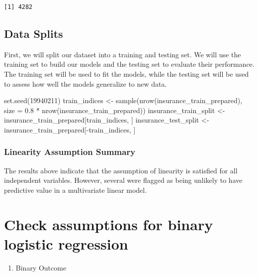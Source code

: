 \documentclass[
  11pt]{article}
\newenvironment{Shaded}{\begin{snugshade}}{\end{snugshade}}
\newcommand{\AttributeTok}[1]{\textcolor[rgb]{0.40,0.45,0.13}{#1}}
\newcommand{\DecValTok}[1]{\textcolor[rgb]{0.68,0.00,0.00}{#1}}
\newcommand{\FloatTok}[1]{\textcolor[rgb]{0.68,0.00,0.00}{#1}}
\newcommand{\FunctionTok}[1]{\textcolor[rgb]{0.28,0.35,0.67}{#1}}
\newcommand{\NormalTok}[1]{\textcolor[rgb]{0.00,0.23,0.31}{#1}}
\newcommand{\OtherTok}[1]{\textcolor[rgb]{0.00,0.23,0.31}{#1}}
\newcommand{\SpecialCharTok}[1]{\textcolor[rgb]{0.37,0.37,0.37}{#1}}
\providecommand{\tightlist}{%
  \setlength{\itemsep}{0pt}\setlength{\parskip}{0pt}}
\begin{document}
\begin{verbatim}
[1] 4282
\end{verbatim}

\subsection{Data Splits}\label{data-splits}

First, we will split our dataset into a training and testing set. We
will use the training set to build our models and the testing set to
evaluate their performance. The training set will be used to fit the
models, while the testing set will be used to assess how well the models
generalize to new data.

\begin{Shaded}
\begin{Highlighting}[]
\FunctionTok{set.seed}\NormalTok{(}\DecValTok{19940211}\NormalTok{)}
\NormalTok{train\_indices }\OtherTok{\textless{}{-}} \FunctionTok{sample}\NormalTok{(}\FunctionTok{nrow}\NormalTok{(insurance\_train\_prepared), }\AttributeTok{size =} \FloatTok{0.8} \SpecialCharTok{*} \FunctionTok{nrow}\NormalTok{(insurance\_train\_prepared))}
\NormalTok{insurance\_train\_split }\OtherTok{\textless{}{-}}\NormalTok{ insurance\_train\_prepared[train\_indices, ]}
\NormalTok{insurance\_test\_split }\OtherTok{\textless{}{-}}\NormalTok{ insurance\_train\_prepared[}\SpecialCharTok{{-}}\NormalTok{train\_indices, ]}
\end{Highlighting}
\end{Shaded}

\subsubsection{Linearity Assumption
Summary}\label{linearity-assumption-summary}

The results above indicate that the assumption of linearity is satisfied
for all independent variables. However, several were flagged as being
unlikely to have predictive value in a multivariate linear model.

\section{Check assumptions for binary logistic
regression}\label{check-assumptions-for-binary-logistic-regression}

\begin{enumerate}
\def\labelenumi{\arabic{enumi}.}
\tightlist
\item
  Binary Outcome
\end{enumerate}
\end{document}
